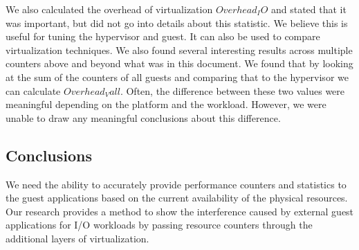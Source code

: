 We also calculated the overhead of virtualization $Overhead_IO$ and stated that it was important, but did not go into details about this statistic.  We believe this is useful for tuning the hypervisor and guest.  It can also be used to compare virtualization techniques.  We also found several interesting results across multiple counters above and beyond what was in this document.  We found that by looking at the sum of the counters of all guests and comparing that to the hypervisor we can calculate $Overhead_Vall$.  Often, the difference between these two values were meaningful depending on the platform and the workload.  However, we were unable to draw any meaningful conclusions about this difference. 


\subsection{Conclusions}
We need the ability to accurately provide performance counters and statistics to the guest applications based on the current availability of the physical resources.  Our research provides a method to show the interference caused by external guest applications for I/O workloads by passing resource counters through the additional layers of virtualization.    
